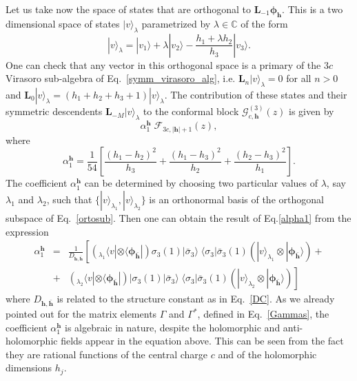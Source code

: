 \documentclass[a4paper,11pt]{article}
\begin{document}
Let us take now the space of states that are orthogonal to $\boldsymbol{L}_{-1}\boldsymbol{\phi}_{\boldsymbol{h}}$. This is a two dimensional space of states $|v\rangle_{\lambda}$ parametrized by $\lambda \in \mathbb{C}$ of the form
\begin{equation}
\label{ortosub}
 |v\rangle_{\lambda}= |v_1\rangle+\lambda |v_2\rangle
 -\frac{h_1+\lambda h_2}{h_3} |v_3\rangle.
\end{equation}
One can check
that any vector in this orthogonal space is a primary of the $3 c$ Virasoro sub-algebra of 
Eq.~\eqref{symm_virasoro_alg}, i.e. $\boldsymbol{L}_n  |v\rangle_{\lambda}=0$ for all $n>0$
and $\boldsymbol{L}_0|v\rangle_{\lambda} = (h_1+h_2+h_3+1)|v\rangle_{\lambda}$.
The contribution of these states and their symmetric descendents $\boldsymbol{L}_{-M}|v\rangle_{\lambda}$ 
to the conformal block $\mathcal{G}_{c, \boldsymbol{h}}^{(3)}(z)$ is given by
\begin{equation}
\alpha_{1}^{\boldsymbol{h}}\;\mathcal{F}_{3c, |\boldsymbol{h}|+1}(z),
\end{equation}
where 
\begin{equation}
\label{alpha1}
\alpha_{1}^{\boldsymbol{h}} =\frac{1}{54}\left[\frac{(h_1-h_2)^2}{h_3}+\frac{(h_1-h_3)^2}{h_2}+\frac{(h_2-h_3)^2}{h_1}\right].
\end{equation}
The coefficient $\alpha_{1}^{\boldsymbol{h}}$ can  be determined by choosing two particular values of $\lambda$, say $\lambda_1$ and $\lambda_2$, such that $\{|v\rangle_{\lambda_1}, |v\rangle_{\lambda_2}\}$ is an orthonormal basis of the orthogonal subspace of Eq.~\eqref{ortosub}. Then one can obtain the result of Eq.\eqref{alpha1} from the expression
\begin{eqnarray}
 \alpha_1^{\boldsymbol{h}}&=&\frac{1}{D_{\boldsymbol{h},\boldsymbol{\bar{h}}}}\left[(_{\lambda_1}\langle v |\otimes \langle \boldsymbol{\phi}_{\boldsymbol{\bar{h}}}|)\sigma_{3}(1)|\bar{\sigma}_3\rangle \;\langle \sigma_{3}|\bar{\sigma}_3(1) (|v\rangle_{\lambda_1}\otimes |\boldsymbol{\phi}_{\boldsymbol{\bar{h}}}\rangle)  \right.+\\ 
 &+&\left.
 ( _{\lambda_2}\langle v| \otimes \langle \boldsymbol{\phi}_{\boldsymbol{\bar{h}}}|)|\sigma_{3}(1)|\bar{\sigma}_3\rangle \;\langle \sigma_{3}|\bar{\sigma}_3(1)(|v\rangle_{\lambda_2}\otimes |\boldsymbol{\phi}_{\boldsymbol{\bar{h}}}\rangle)  \right]
\end{eqnarray}
where $D_{\boldsymbol{h},\boldsymbol{\bar{h}}}$ is related to the structure constant as in Eq.~\eqref{DC}. As we already pointed out for the matrix elements $\Gamma$ and $\Gamma^*$, defined in Eq.~\eqref{Gammas}, the coefficient $\alpha^{\boldsymbol{h}}_1$  is algebraic in nature, despite the holomorphic and anti-holomorphic fields appear in the equation above. This can be seen from the fact they are rational functions of the central charge $c$ and of the holomorphic dimensions $h_j$.
\end{document}
